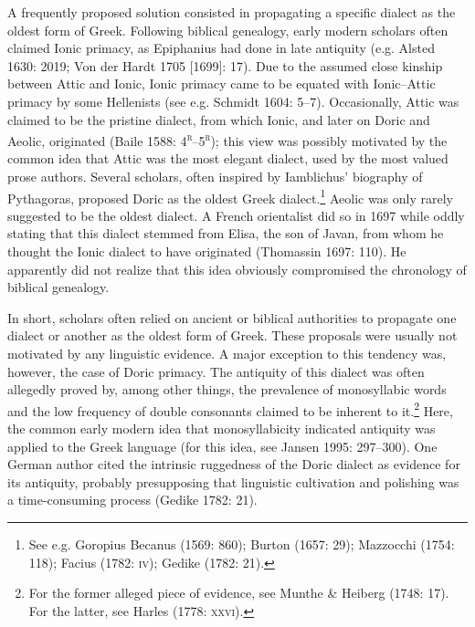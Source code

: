 \documentclass[12pt]{article}
\newenvironment{styleStandard}{\renewcommand\baselinestretch{1.25}\setlength\leftskip{0in}\setlength\rightskip{0in}\setlength\parindent{0.1972in}\setlength\parfillskip{0pt plus 1fil}\setlength\parskip{0in plus 1pt}\writerlistparindent\writerlistleftskip\leavevmode\normalfont\normalsize\writerlistlabel\ignorespaces}{\unskip\vspace{0in plus 1pt}\par}
\newcommand\writerlistleftskip{}
\newcommand\writerlistparindent{}
\newcommand\writerlistlabel{}
\begin{document}
\begin{styleStandard}
A frequently proposed solution consisted in propagating a specific dialect as the oldest form of Greek. Following biblical genealogy, early modern scholars often claimed Ionic primacy, as Epiphanius had done in late antiquity (e.g. Alsted 1630: 2019; Von der Hardt 1705 [1699]: 17). Due to the assumed close kinship between Attic and Ionic, Ionic primacy came to be equated with Ionic–Attic primacy by some Hellenists (see e.g. Schmidt 1604: 5–7). Occasionally, Attic was claimed to be the pristine dialect, from which Ionic, and later on Doric and Aeolic, originated (Baile 1588: 4\textsc{\textsuperscript{r}}–5\textsc{\textsuperscript{r}}); this view was possibly motivated by the common idea that Attic was the most elegant dialect, used by the most valued prose authors. Several scholars, often inspired by Iamblichus’ biography of Pythagoras, proposed Doric as the oldest Greek dialect.\footnote{ See e.g. Goropius Becanus (1569: 860); Burton (1657: 29); Mazzocchi (1754: 118); Facius (1782: \textsc{iv}); Gedike (1782: 21).} Aeolic was only rarely suggested to be the oldest dialect. A French orientalist did so in 1697 while oddly stating that this dialect stemmed from Elisa, the son of Javan, from whom he thought the Ionic dialect to have originated (Thomassin 1697: 110). He apparently did not realize that this idea obviously compromised the chronology of biblical genealogy.
\end{styleStandard}

\begin{styleStandard}
In short, scholars often relied on ancient or biblical authorities to propagate one dialect or another as the oldest form of Greek. These proposals were usually not motivated by any linguistic evidence. A major exception to this tendency was, however, the case of Doric primacy. The antiquity of this dialect was often allegedly proved by, among other things, the prevalence of monosyllabic words and the low frequency of double consonants claimed to be inherent to it.\footnote{ For the former alleged piece of evidence, see Munthe \& Heiberg (1748: 17). For the latter, see Harles (1778: \textsc{xxvi).}} Here, the common early modern idea that monosyllabicity indicated antiquity was applied to the Greek language (for this idea, see Jansen 1995: 297–300). One German author cited the intrinsic ruggedness of the Doric dialect as evidence for its antiquity, probably presupposing that linguistic cultivation and polishing was a time-consuming process (Gedike 1782: 21).
\end{styleStandard}
\end{document}
